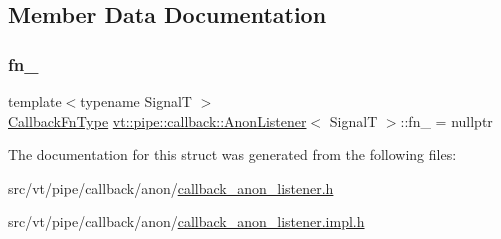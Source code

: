 \subsection{Member Data Documentation}
\mbox{\label{structvt_1_1pipe_1_1callback_1_1_anon_listener_a6f708087804e0304e627db3f446bb449}} 
\subsubsection{\texorpdfstring{fn\+\_\+}{fn\_}}
{\footnotesize\ttfamily template$<$typename SignalT $>$ \\
\hyperlink{structvt_1_1pipe_1_1callback_1_1_anon_listener_ad5d8a2cc6a1599642855e92bbd10f89c}{Callback\+Fn\+Type} \hyperlink{structvt_1_1pipe_1_1callback_1_1_anon_listener}{vt\+::pipe\+::callback\+::\+Anon\+Listener}$<$ SignalT $>$\+::fn\+\_\+ = nullptr\hspace{0.3cm}{\ttfamily [private]}}



The documentation for this struct was generated from the following files\+:\begin{DoxyCompactItemize}
\item 
src/vt/pipe/callback/anon/\hyperlink{callback__anon__listener_8h}{callback\+\_\+anon\+\_\+listener.\+h}\item 
src/vt/pipe/callback/anon/\hyperlink{callback__anon__listener_8impl_8h}{callback\+\_\+anon\+\_\+listener.\+impl.\+h}\end{DoxyCompactItemize}
